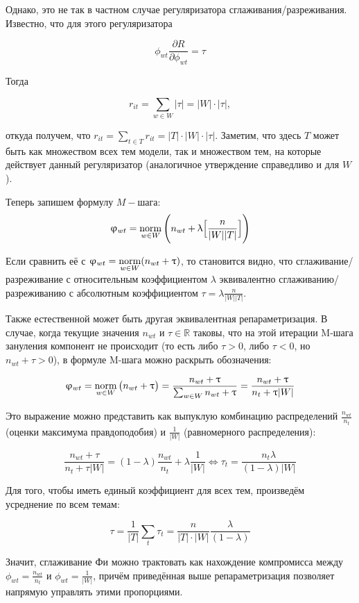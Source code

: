 Однако, это не так в частном случае регуляризатора сглаживания/разреживания. Известно, что для этого регуляризатора 

\[
\phi_{wt} \frac{\partial R}{\partial \phi_{wt}} = \tau
\]

Тогда

\[
r_{it} = \sum_{w\in W} \Big| \tau \Big| = |W| \cdot |\tau|,
\]

откуда получем, что $r_{it} = \sum_{t\in T} r_{it} = |T| \cdot |W| \cdot |\tau|$. Заметим, что здесь $T$ может быть как множеством всех тем модели, так и множеством тем, на которые действует данный регуляризатор (аналогичное утверждение справедливо и для $W$).

Теперь запишем формулу $M-$шага:
\[
    \upvarphi_{wt} = \mathop{\mathrm{norm}}\limits_{w \in W}\Bigg(
        n_{wt} + \uplambda \Big[
            \frac{n}{|W||T|}
            \Big]
    \Bigg)
\]

Если сравнить её с $\upvarphi_{wt} = \mathop{\mathrm{norm}}\limits_{w \in W}(n_{wt} + \uptau)$, то становится видно, что сглаживание/разреживание с относительным коэффициентом $\lambda$ эквивалентно сглаживанию/разреживанию с абсолютным коэффициентом $\tau=\lambda \frac{n}{|W||T|}$.

Также естественной может быть другая эквивалентная репараметризация. В случае, когда текущие значения $n_{wt}$ и $\tau \in \mathbb{R}$ таковы, что на этой итерации M-шага зануления компонент не происходит (то есть либо $\tau > 0$, либо $\tau < 0$, но $n_{wt} + \tau > 0$), в формуле M-шага можно раскрыть обозначения:

\[
\upvarphi_{wt} = \mathop{\mathrm{norm}}\limits_{w \in W} \big( n_{wt} + \uptau \big) = \frac{n_{wt} + \uptau }{\sum_{w \in W} n_{wt} + \uptau } = \frac{n_{wt} + \uptau }{n_{t} + \uptau |W|}
\]

Это выражение можно представить как выпуклую комбинацию распределений  $\frac{n_{wt}}{n_t}$ (оценки максимума правдоподобия) и $\frac{1}{|W|}$ (равномерного распределения):

\[
\frac{n_{wt} + \tau}{n_{t} + \tau |W|} = (1-\lambda) \frac{n_{wt}}{n_t} + \lambda \frac{1}{|W|} \iff \tau_t  = \frac{n_t \lambda}{(1-\lambda) |W|}
\]

Для того, чтобы иметь единый коэффициент для всех тем, произведём усреднение по всем темам: 

\[
\tau = \frac{1}{|T|} \sum_t \tau_t = \frac{n}{|T|\cdot|W|} \frac{\lambda}{(1-\lambda)}  \label{sp_phi_rel2abs}
\]

Значит, сглаживание Фи можно трактовать как нахождение компромисса между $\phi_{wt} = \frac{n_{wt}}{n_t}$ и $\phi_{wt} = \frac{1}{|W|}$, причём приведённая выше репараметризация позволяет напрямую управлять этими пропорциями.

